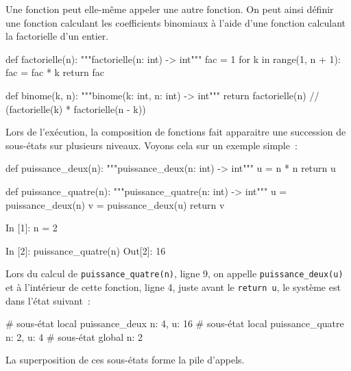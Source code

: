\documentclass{magnolia}
\begin{document}
Une fonction peut elle-même appeler une autre fonction. On peut ainsi définir une fonction
calculant les coefficients binomiaux à l'aide d'une fonction calculant la factorielle
d'un entier.

\begin{pythoncodeline}
def factorielle(n):
    """factorielle(n: int) -> int"""
    fac = 1
    for k in range(1, n + 1):
        fac = fac * k
    return fac

def binome(k, n):
    """binome(k: int, n: int) -> int"""
    return factorielle(n) // (factorielle(k) * factorielle(n - k))
\end{pythoncodeline}

\noindent
Lors de l'exécution, la composition de fonctions fait apparaitre une succession de
sous-états sur plusieurs niveaux. Voyons cela sur un exemple simple~:

\begin{pythoncodeline}
def puissance_deux(n):
    """puissance_deux(n: int) -> int"""
    u = n * n
    return u

def puissance_quatre(n):
    """puissance_quatre(n: int) -> int"""
    u = puissance_deux(n)
    v = puissance_deux(u)
    return v
\end{pythoncodeline}


\begin{pythoncode}
In [1]: n = 2

In [2]: puissance_quatre(n)
Out[2]: 16
\end{pythoncode}

\noindent Lors du calcul de \verb+puissance_quatre(n)+, ligne 9, on appelle \verb!puissance_deux(u)! et
à l'intérieur de cette fonction, ligne 4, juste avant le \verb_return u_, le système est dans l'état suivant~:

\begin{pythoncode}
# sous-état local puissance_deux    {n: 4, u: 16}
# sous-état local puissance_quatre  {n: 2, u: 4}
# sous-état global                  {n: 2}
\end{pythoncode}
\noindent
La superposition de ces sous-états forme la pile d'appels.




\end{document}
